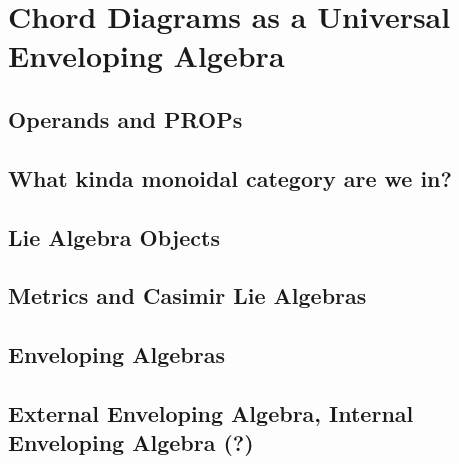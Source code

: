 \chapter{Chord Diagrams as a Universal Enveloping Algebra}
\label{ch:chord-diagrams-as-a-universal-enveloping-algebra}


\section{Operands and PROPs}

\section{What kinda monoidal category are we in?}

\section{Lie Algebra Objects}

\section{Metrics and Casimir Lie Algebras}

\section{Enveloping Algebras}

\section{External Enveloping Algebra, Internal Enveloping Algebra (?)}

